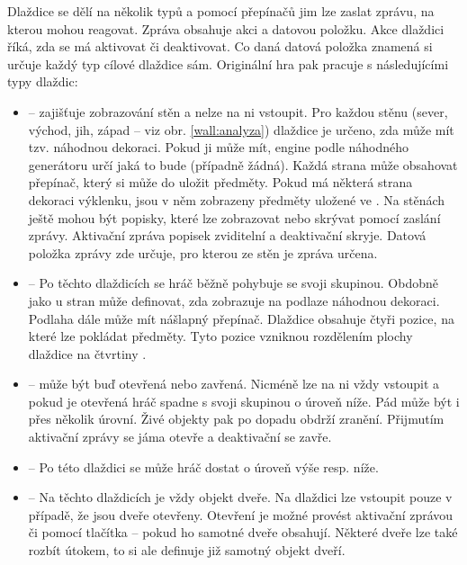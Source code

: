 Dlaždice se dělí na několik typů a pomocí přepínačů jim lze zaslat zprávu, na kterou mohou reagovat. Zpráva obsahuje akci a datovou položku. 
Akce dlaždici říká, zda se má aktivovat či deaktivovat. Co daná datová položka znamená si určuje každý typ cílové dlaždice sám. 
Originální hra pak pracuje s následujícími typy dlaždic:
\begin{itemize}
\item {} -- zajišťuje zobrazování stěn a nelze na ni vstoupit. Pro každou stěnu  (sever, východ, jih, západ -- viz obr. \ref{wall:analyza}) dlaždice 
	je určeno, zda může mít tzv. náhodnou dekoraci. Pokud ji může mít, engine podle náhodného generátoru
	určí jaká to bude (případně žádná). Každá strana může obsahovat přepínač, který si může do  uložit předměty.
	Pokud má některá strana  dekoraci výklenku, jsou v něm zobrazeny předměty uložené ve .
	Na stěnách  ještě mohou být popisky, které lze zobrazovat nebo skrývat pomocí zaslání zprávy. Aktivační zpráva 
	popisek zviditelní a deaktivační skryje. Datová položka zprávy zde určuje, pro kterou ze stěn  je zpráva určena.

\item {} -- Po těchto dlaždicích se hráč běžně pohybuje se svoji skupinou. Obdobně jako u stran  může definovat,
	zda zobrazuje na podlaze náhodnou dekoraci. Podlaha dále může mít nášlapný přepínač. Dlaždice obsahuje čtyři pozice,
	na které lze pokládat předměty. Tyto pozice vzniknou rozdělením plochy dlaždice na čtvrtiny .


\item {} --  může být buď otevřená nebo zavřená. Nicméně lze na ni vždy vstoupit a pokud je otevřená 
	hráč spadne s svoji skupinou o úroveň níže. Pád může být i přes několik úrovní. Živé objekty pak po
	dopadu obdrží zranění. Přijmutím aktivační zprávy se jáma otevře a deaktivační se zavře.

\item {} -- Po této dlaždici se může hráč dostat o úroveň výše resp. níže.

\item {} -- Na těchto dlaždicích je vždy objekt dveře. Na dlaždici lze vstoupit pouze v případě, že jsou dveře
	otevřeny. Otevření je možné provést aktivační zprávou či pomocí tlačítka -- pokud ho samotné dveře obsahují. 
	Některé dveře lze také rozbít útokem, to si ale definuje již samotný objekt dveří.


\end{itemize}
